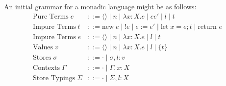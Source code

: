 \documentclass{article}
\begin{document}
An initial grammar for a monadic language might be as follows:
\begin{equation*}
\begin{split}
    \textrm{Pure Terms} \; e &::= \langle \rangle \; | \; n \; | \; \lambda x : X . e \; | \; e e' \; | \; l \; | \; {t}\\
    \textrm{Impure Terms} \; t &::= \textrm{new} \; e \; | \; !e \; | \; e := e' \; | \; \textrm{let} \; x = e ; t \; | \; \textrm{return }e\\
    \textrm{Impure Terms} \; e &::= \langle \rangle \; | \; n \; | \; \lambda x : X . e \; | \; l \; | \; {t}\\
    \textrm{Values} \; v &::= \langle \rangle \; | \; n \; | \; \lambda x : X. e \; | \; l \; | \; \{t\}\\
    \textrm{Stores} \; \sigma &::= \cdot \; | \; \sigma, l : v\\
    \textrm{Contexts} \; \Gamma &::= \cdot \; | \; \Gamma, x : X\\
    \textrm{Store Typings} \; \Sigma &::= \cdot \; | \; \Sigma, l : X
\end{split}
\end{equation*}
\end{document}
